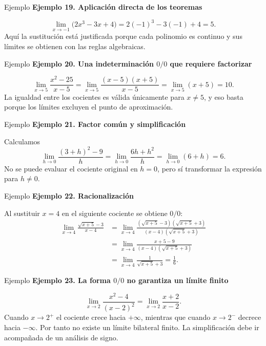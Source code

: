 \documentclass[12pt,aspectratio=169]{beamer}
\begin{document}
\begin{frame}[t,allowframebreaks]{Ejemplo}
{\color{azul}\bfseries Ejemplo 19. Aplicación directa de los teoremas}\par\medskip

\[
 \lim_{x\to-1}\bigl(2x^3-3x+4\bigr)=2(-1)^3-3(-1)+4=\boxed5.
\]
Aquí la sustitución está justificada porque cada polinomio es continuo y sus límites se obtienen con las reglas algebraicas.
\end{frame}


\begin{frame}[t,allowframebreaks]{Ejemplo}
{\color{azul}\bfseries Ejemplo 20. Una indeterminación $0/0$ que requiere factorizar}\par\medskip

\[
 \lim_{x\to5}\frac{x^2-25}{x-5}
 =\lim_{x\to5}\frac{(x-5)(x+5)}{x-5}
 =\lim_{x\to5}(x+5)=\boxed{10}.
\]
La igualdad entre los cocientes es válida únicamente para $x\ne5$, y eso basta porque los límites excluyen el punto de aproximación.
\end{frame}


\begin{frame}[t,allowframebreaks]{Ejemplo}
{\color{azul}\bfseries Ejemplo 21. Factor común y simplificación}\par\medskip

Calculamos
\[
 \lim_{h\to0}\frac{(3+h)^2-9}{h}=
 \lim_{h\to0}\frac{6h+h^2}{h}
 =\lim_{h\to0}(6+h)=\boxed6.
\]
No se puede evaluar el cociente original en $h=0$, pero sí transformar la expresión para $h\ne0$.
\end{frame}


\begin{frame}[t,allowframebreaks]{Ejemplo}
{\color{azul}\bfseries Ejemplo 22. Racionalización}\par\medskip

Al sustituir $x=4$ en el siguiente cociente se obtiene $0/0$:
\begin{align*}
 \lim_{x\to4}\frac{\sqrt{x+5}-3}{x-4}
 &=\lim_{x\to4}\frac{(\sqrt{x+5}-3)(\sqrt{x+5}+3)}{(x-4)(\sqrt{x+5}+3)}\\
 &=\lim_{x\to4}\frac{x+5-9}{(x-4)(\sqrt{x+5}+3)}\\
 &=\lim_{x\to4}\frac1{\sqrt{x+5}+3}=\boxed{\frac16}.
\end{align*}
\end{frame}


\begin{frame}[t,allowframebreaks]{Ejemplo}
{\color{azul}\bfseries Ejemplo 23. La forma $0/0$ no garantiza un límite finito}\par\medskip

\[
 \lim_{x\to2}\frac{x^2-4}{(x-2)^2}
 =\lim_{x\to2}\frac{x+2}{x-2}.
\]
Cuando $x\to2^+$ el cociente crece hacia $+\infty$, mientras que cuando $x\to2^-$ decrece hacia $-\infty$. Por tanto no existe un límite bilateral finito. La simplificación debe ir acompañada de un análisis de signo.
\end{frame}
\end{document}

